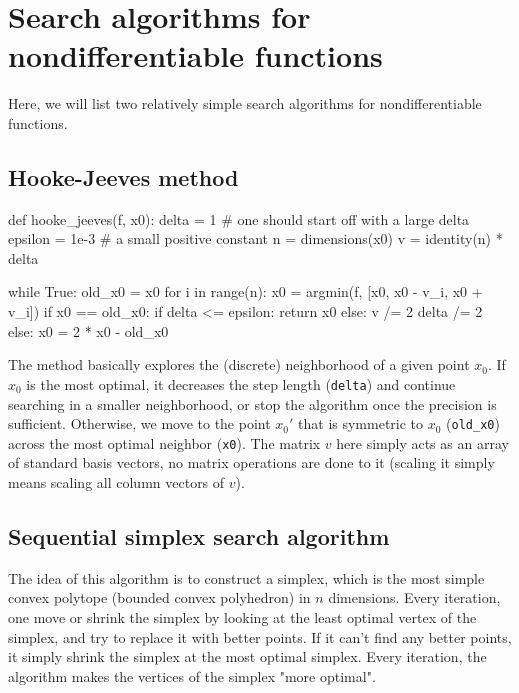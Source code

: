 

\section{Search algorithms for nondifferentiable functions} %
\label{sec:Search algorithms for nondifferentiable functions}

Here, we will list two relatively simple search algorithms for nondifferentiable
functions.

\subsection{Hooke-Jeeves method} %
\label{sub:Hooke-Jeeves method}

\begin{python}
def hooke_jeeves(f, x0):
  delta = 1 # one should start off with a large delta
  epsilon = 1e-3 # a small positive constant
  n = dimensions(x0)
  v = identity(n) * delta

  while True:
    old_x0 = x0
    for i in range(n):
      x0 = argmin(f, [x0, x0 - v_i, x0 + v_i])
    if x0 == old_x0:
      if delta <= epsilon:
        return x0
      else:
        v /= 2
        delta /= 2
    else:
      x0 = 2 * x0 - old_x0
\end{python}

The method basically explores the (discrete) neighborhood of a given point \(
x_{0} \). If \( x_{0} \) is the most optimal, it decreases the step length
(\verb|delta|) and continue searching in a smaller neighborhood, or stop the
algorithm once the precision is sufficient. Otherwise, we move to the point \(
x_{0}' \) that is symmetric to \( x_{0} \) (\verb|old_x0|) across the most
optimal neighbor (\verb|x0|). The matrix \( v \) here simply acts as an array of
standard basis vectors, no matrix operations are done to it (scaling it simply
means scaling all column vectors of \( v \)).


\subsection{Sequential simplex search algorithm} %
\label{sub:Sequential simplex search algorithm}

The idea of this algorithm is to construct a simplex, which is the most simple
convex polytope (bounded convex polyhedron) in \( n \) dimensions. Every
iteration, one move or shrink the simplex by looking at the least optimal vertex
of the simplex, and try to replace it with better points. If it can't find any
better points, it simply shrink the simplex at the most optimal simplex. Every
iteration, the algorithm makes the vertices of the simplex "more optimal".

